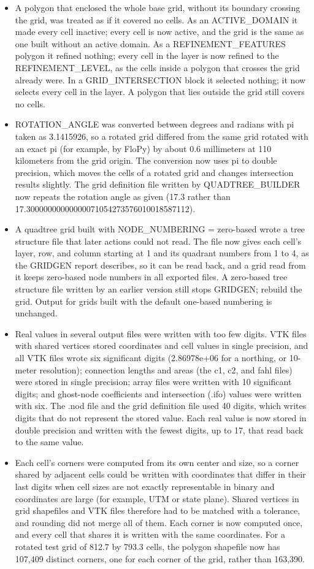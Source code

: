 \begin{itemize}[label=--]
  \item A polygon that enclosed the whole base grid, without its boundary crossing the grid, was treated as if it covered no cells. As an ACTIVE\_DOMAIN it made every cell inactive; every cell is now active, and the grid is the same as one built without an active domain. As a REFINEMENT\_FEATURES polygon it refined nothing; every cell in the layer is now refined to the REFINEMENT\_LEVEL, as the cells inside a polygon that crosses the grid already were. In a GRID\_INTERSECTION block it selected nothing; it now selects every cell in the layer. A polygon that lies outside the grid still covers no cells.
  \item ROTATION\_ANGLE was converted between degrees and radians with pi taken as 3.1415926, so a rotated grid differed from the same grid rotated with an exact pi (for example, by FloPy) by about 0.6 millimeters at 110 kilometers from the grid origin. The conversion now uses pi to double precision, which moves the cells of a rotated grid and changes intersection results slightly. The grid definition file written by QUADTREE\_BUILDER now repeats the rotation angle as given (17.3 rather than 17.30000000000000071054273576010018587112).
  \item A quadtree grid built with NODE\_NUMBERING = zero-based wrote a tree structure file that later actions could not read. The file now gives each cell's layer, row, and column starting at 1 and its quadrant numbers from 1 to 4, as the GRIDGEN report describes, so it can be read back, and a grid read from it keeps zero-based node numbers in all exported files. A zero-based tree structure file written by an earlier version still stops GRIDGEN; rebuild the grid. Output for grids built with the default one-based numbering is unchanged.
  \item Real values in several output files were written with too few digits. VTK files with shared vertices stored coordinates and cell values in single precision, and all VTK files wrote six significant digits (2.86978e+06 for a northing, or 10-meter resolution); connection lengths and areas (the c1, c2, and fahl files) were stored in single precision; array files were written with 10 significant digits; and ghost-node coefficients and intersection (.ifo) values were written with six. The .nod file and the grid definition file used 40 digits, which writes digits that do not represent the stored value. Each real value is now stored in double precision and written with the fewest digits, up to 17, that read back to the same value.
  \item Each cell's corners were computed from its own center and size, so a corner shared by adjacent cells could be written with coordinates that differ in their last digits when cell sizes are not exactly representable in binary and coordinates are large (for example, UTM or state plane). Shared vertices in grid shapefiles and VTK files therefore had to be matched with a tolerance, and rounding did not merge all of them. Each corner is now computed once, and every cell that shares it is written with the same coordinates. For a rotated test grid of 812.7 by 793.3 cells, the polygon shapefile now has 107,409 distinct corners, one for each corner of the grid, rather than 163,390.

\end{itemize}
